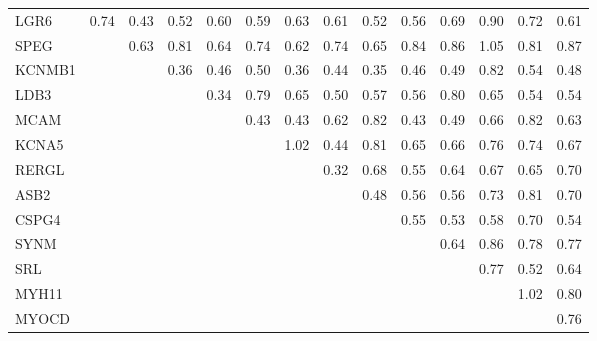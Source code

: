 \begin{longtable}{lrrrrrrrrrrrrr}
\bottomrule
\endlastfoot
LGR6   &       0.74 &         0.43 &       0.52 &       0.60 &        0.59 &        0.63 &       0.61 &        0.52 &       0.56 &      0.69 &        0.90 &        0.72 &        0.61 \\
SPEG   &            &         0.63 &       0.81 &       0.64 &        0.74 &        0.62 &       0.74 &        0.65 &       0.84 &      0.86 &        1.05 &        0.81 &        0.87 \\
KCNMB1 &            &              &       0.36 &       0.46 &        0.50 &        0.36 &       0.44 &        0.35 &       0.46 &      0.49 &        0.82 &        0.54 &        0.48 \\
LDB3   &            &              &            &       0.34 &        0.79 &        0.65 &       0.50 &        0.57 &       0.56 &      0.80 &        0.65 &        0.54 &        0.54 \\
MCAM   &            &              &            &            &        0.43 &        0.43 &       0.62 &        0.82 &       0.43 &      0.49 &        0.66 &        0.82 &        0.63 \\
KCNA5  &            &              &            &            &             &        1.02 &       0.44 &        0.81 &       0.65 &      0.66 &        0.76 &        0.74 &        0.67 \\
RERGL  &            &              &            &            &             &             &       0.32 &        0.68 &       0.55 &      0.64 &        0.67 &        0.65 &        0.70 \\
ASB2   &            &              &            &            &             &             &            &        0.48 &       0.56 &      0.56 &        0.73 &        0.81 &        0.70 \\
CSPG4  &            &              &            &            &             &             &            &             &       0.55 &      0.53 &        0.58 &        0.70 &        0.54 \\
SYNM   &            &              &            &            &             &             &            &             &            &      0.64 &        0.86 &        0.78 &        0.77 \\
SRL    &            &              &            &            &             &             &            &             &            &           &        0.77 &        0.52 &        0.64 \\
MYH11  &            &              &            &            &             &             &            &             &            &           &             &        1.02 &        0.80 \\
MYOCD  &            &              &            &            &             &             &            &             &            &           &             &             &        0.76 \\
\end{longtable}


